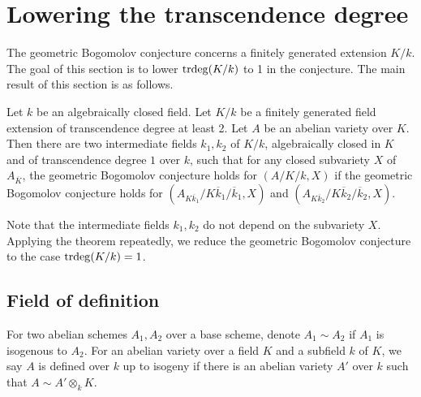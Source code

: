\documentclass[12pt]{amsart}
\begin{document}
%
%
%
%
%
%
%






\section{Lowering the transcendence degree}\label{sec trdeg}

The geometric Bogomolov conjecture concerns a finitely generated extension $K/k$.
The goal of this section is to lower ${\mathrm{trdeg}}(K/k)$ to 1 in the conjecture.
The main result of this section is as follows. 

\begin{pro}\label{changefield} 
Let $k$ be an algebraically closed field.
Let $K/k$ be a finitely generated field extension of transcendence degree at least 2.
Let $A$ be an abelian variety over $K$. 
Then there are two intermediate fields $k_1,k_2$ of $K/k$, algebraically closed in $K$ and of transcendence degree $1$ over $k$, such that for any closed subvariety $X$ of $A_{\overline{K}}$,  the geometric Bogomolov conjecture holds for $(A/K/k, X)$ if the geometric Bogomolov conjecture holds for $(A_{K\overline k_1}/K\overline k_1/\overline k_1,X)$ and $(A_{K\overline k_2}/K\overline k_2/\overline k_2,X)$.
\end{pro}

Note that the intermediate fields $k_1,k_2$ do not depend on the subvariety $X$.
Applying the theorem repeatedly, we reduce the geometric Bogomolov conjecture to the case ${\mathrm{trdeg}}(K/k)=1$. 



\subsection{Field of definition}
For two abelian schemes $A_1,A_2$ over a base scheme,  denote $A_1\sim A_2$ if $A_1$ is isogenous to $A_2.$
For an abelian variety over a field $K$ and a subfield $k$ of $K$, we say $A$ is defined over $k$ up to isogeny if there is an abelian variety $A'$ over $k$ such that $A\sim A'\otimes_kK.$
\end{document}
